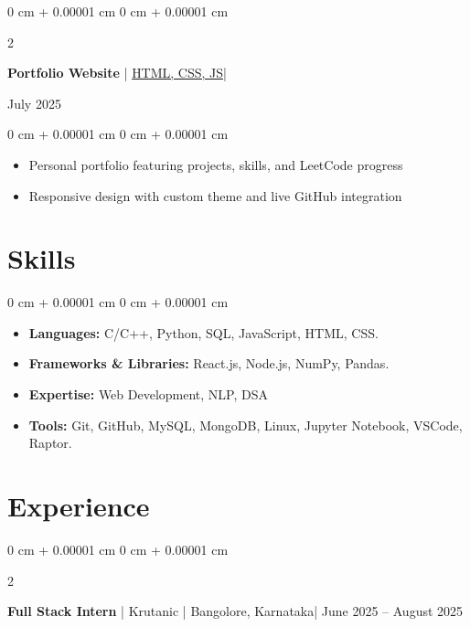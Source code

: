 \documentclass[10pt, letterpaper]{article}
\newenvironment{highlights}{
    \begin{itemize}[
        topsep=0.10 cm,
        parsep=0.10 cm,
        partopsep=0pt,
        itemsep=0pt,
        leftmargin=0 cm + 10pt
    ]
}{
    \end{itemize}
} %
\newenvironment{onecolentry}{
    \begin{adjustwidth}{
        0 cm + 0.00001 cm
    }{
        0 cm + 0.00001 cm
    }
}{
    \end{adjustwidth}
} %
\newenvironment{twocolentry}[2][]{
    \onecolentry
    \def\secondColumn{#2}
    \setcolumnwidth{\fill, 4.5 cm}
    \begin{paracol}{2}
}{
    \switchcolumn \raggedleft \secondColumn
    \end{paracol}
    \endonecolentry
} %
\begin{document}
    \begin{twocolentry}{July 2025}
       \hspace{0.4 em} \textbf{Portfolio Website} | 
       \href{https://github.com/neerajbabudevagiri/Portfolio}{ 
   HTML, CSS, JS| {\faGithub} }
    \end{twocolentry}
    \vspace{0.10 cm}
    \begin{onecolentry}
        \begin{itemize}[leftmargin=2 em]
            \item  Personal portfolio featuring projects, skills, and LeetCode progress
            \item Responsive design with custom theme and live GitHub integration
           
        \end{itemize}
    \end{onecolentry}
 \vspace{0.1 cm}
\section{Skills}
\vspace{0.1 cm}

        \begin{onecolentry}
            \begin{highlights}
                \item \textbf{Languages:} C/C++, Python, SQL, JavaScript, HTML, CSS. 
                \item \textbf{Frameworks \& Libraries:} React.js, Node.js, NumPy, Pandas. 
                \item \textbf{Expertise:}  Web Development, NLP, DSA
                \item \textbf{Tools:} Git, GitHub, MySQL, MongoDB, Linux, Jupyter Notebook, VSCode, Raptor.
            \end{highlights}
        \end{onecolentry}


     
    \section{Experience}
    \vspace{0.1 cm}
        \begin{twocolentry}{
            June 2025 – August 2025
        }
            \textbf{Full Stack Intern } | Krutanic | Bangolore, Karnataka|\end{twocolentry}
\end{document}
